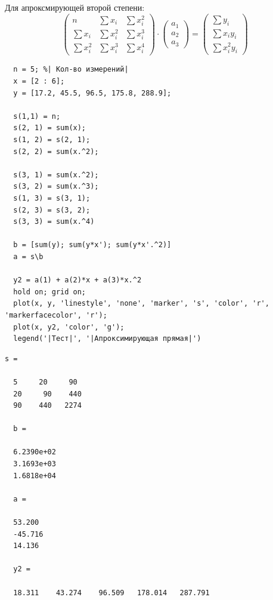 Для апроксмирующей второй степени:
\[
  \begin{pmatrix}
    n & \sum x_{i} & \sum x_{i}^{2} \\[1em]
    \sum x_{i} & \sum x_{i}^{2} & \sum x_{i}^{3} \\[1em]
    \sum x_{i}^{2} & \sum x_{i}^{3} & \sum x_{i}^{4}
  \end{pmatrix}
  \cdot
  \begin{pmatrix}
    a_{1} \\[1em]
    a_{2} \\[1em]
    a_{3}
  \end{pmatrix}
  =
  \begin{pmatrix}
    \sum y_{i} \\[1em]
    \sum x_{i}y_{i} \\[1em]
    \sum x_{i}^{2}y_{i}
  \end{pmatrix}
\]
\begin{lstlisting}
  n = 5; %| Кол-во измерений|
  x = [2 : 6];
  y = [17.2, 45.5, 96.5, 175.8, 288.9];

  s(1,1) = n;
  s(2, 1) = sum(x);
  s(1, 2) = s(2, 1);
  s(2, 2) = sum(x.^2);

  s(3, 1) = sum(x.^2);
  s(3, 2) = sum(x.^3);
  s(1, 3) = s(3, 1);
  s(2, 3) = s(3, 2);
  s(3, 3) = sum(x.^4)

  b = [sum(y); sum(y*x'); sum(y*x'.^2)]
  a = s\b

  y2 = a(1) + a(2)*x + a(3)*x.^2
  hold on; grid on;
  plot(x, y, 'linestyle', 'none', 'marker', 's', 'color', 'r', 'markerfacecolor', 'r');
  plot(x, y2, 'color', 'g');
  legend('|Тест|', '|Апроксимирующая прямая|')
\end{lstlisting}
\begin{lstlisting}[backgroundcolor=\color{cyan}]
  s =

  5     20     90
  20     90    440
  90    440   2274

  b =

  6.2390e+02
  3.1693e+03
  1.6818e+04

  a =

  53.200
  -45.716
  14.136

  y2 =

  18.311    43.274    96.509   178.014   287.791
\end{lstlisting}
